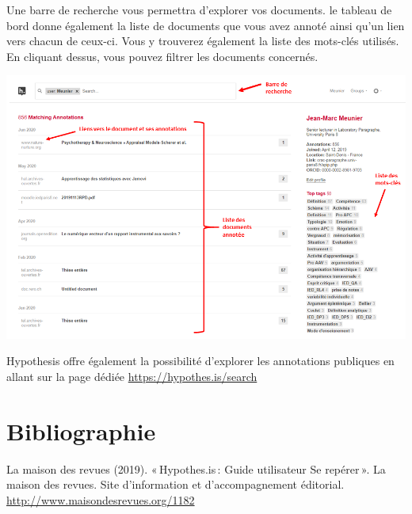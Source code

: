 \documentclass[
]{book}
\begin{document}
Une barre de recherche vous permettra d'explorer vos documents. le tableau de bord donne également la liste de documents que vous avez annoté ainsi qu'un lien vers chacun de ceux-ci. Vous y trouverez également la liste des mots-clés utilisés. En cliquant dessus, vous pouvez filtrer les documents concernés.

\includegraphics{img/dashboard.png}

Hypothesis offre également la possibilité d'explorer les annotations publiques en allant sur la page dédiée \url{https://hypothes.is/search}

\hypertarget{bibliographie}{%
\chapter*{Bibliographie}\label{bibliographie}}

La maison des revues (2019). «\,Hypothes.is\,: Guide utilisateur Se repérer\,». La maison des revues. Site d'information et d'accompagnement éditorial. \url{http://www.maisondesrevues.org/1182}

\backmatter
  
\end{document}
